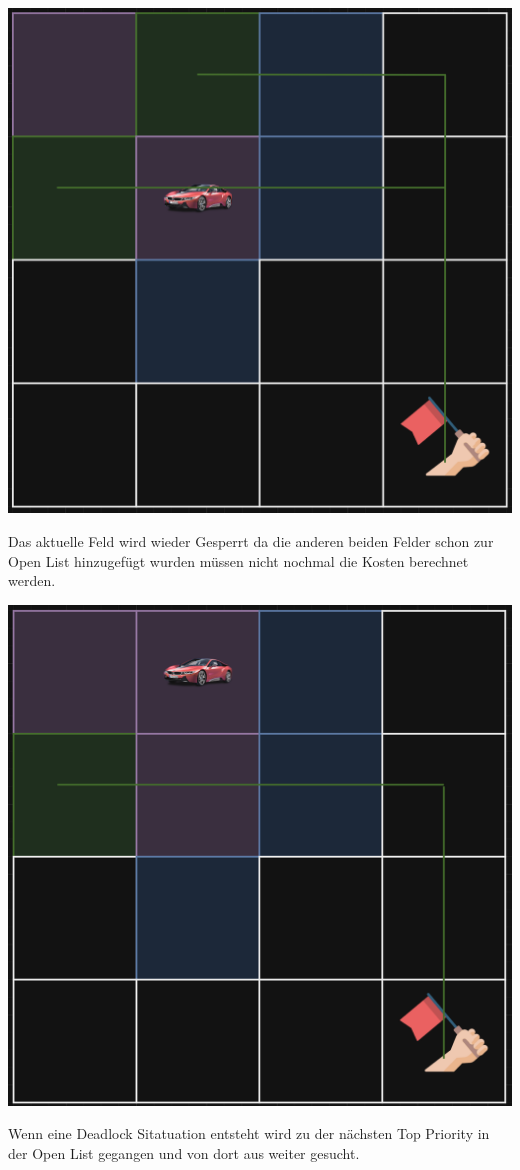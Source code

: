 {
\begin{minipage}{0.4\linewidth}
  \includegraphics[scale=.125]{Cars/img3.png}
\end{minipage}
\begin{minipage}{0.6\linewidth}
Das aktuelle Feld wird wieder Gesperrt da die anderen beiden Felder schon zur Open List hinzugefügt wurden müssen nicht nochmal die Kosten berechnet werden. 
\end{minipage}
}
{
\begin{minipage}{0.4\linewidth}
  \includegraphics[scale=.125]{Cars/img4.png}
\end{minipage}
\begin{minipage}{0.6\linewidth}
Wenn eine Deadlock Sitatuation entsteht wird zu der nächsten Top Priority in der Open List gegangen und von dort aus weiter gesucht.
\end{minipage}
}
